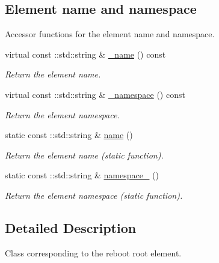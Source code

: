 \subsection*{Element name and namespace}
\label{_amgrpd4b5b61f6e07390f4af2465e04571f34}
Accessor functions for the element name and namespace. \begin{DoxyCompactItemize}
\item 
virtual const ::std::string \& \hyperlink{classopenstack_1_1xml_1_1Reboot___a00fdca2924a32eeec9c328b083cb064f}{\_\-name} () const 
\begin{DoxyCompactList}\small\item\em Return the element name. \item\end{DoxyCompactList}\item 
virtual const ::std::string \& \hyperlink{classopenstack_1_1xml_1_1Reboot___a268a790a7d1b326552c1bc3f56a2a8d6}{\_\-namespace} () const 
\begin{DoxyCompactList}\small\item\em Return the element namespace. \item\end{DoxyCompactList}\item 
static const ::std::string \& \hyperlink{classopenstack_1_1xml_1_1Reboot___a2e598ca06c4e29d3221f260307bff2d9}{name} ()
\begin{DoxyCompactList}\small\item\em Return the element name (static function). \item\end{DoxyCompactList}\item 
static const ::std::string \& \hyperlink{classopenstack_1_1xml_1_1Reboot___af8a1a6b2618b9fb814381769ed4fac1d}{namespace\_\-} ()
\begin{DoxyCompactList}\small\item\em Return the element namespace (static function). \item\end{DoxyCompactList}\end{DoxyCompactItemize}


\subsection{Detailed Description}
Class corresponding to the reboot root element. 

